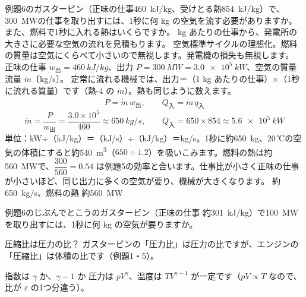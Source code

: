 \label{ph:熱-7:ex14}
\begin{phreidai}[発電所のガスタービンが吸いこむ空気の量]
例題6のガスタービン（正味の仕事\qty{460}{kJ/kg}、受けとる熱\qty{854}{kJ/kg}）で、\qty{300}{MW}の仕事を取り出すには、1秒に何 kg の空気を流す必要がありますか。また、燃料で1秒に入れる熱はいくらですか。
 kg あたりの仕事から、発電所の大きさに必要な空気の流れを見積もります。
\phmushi
空気標準サイクルの理想化。燃料の質量は空気にくらべて小さいので無視します。発電機の損失も無視します。
\phzu
正味の仕事 $w_{\text{出}}=\qty{460}{kJ/kg}$、出力 $P=\qty{300}{MW}=\qty{3.0e5}{kW}$、空気の質量流量 $\dot m$〔kg/s〕。
\phriyu
定常に流れる機械では、出力＝（1 kg あたりの仕事）×（1秒に流れる質量）です（熱-4 の $\dot m$）。熱も同じように数えます。
\phtateru
\[P=\dot m\,w_{\text{出}},\qquad\dot Q_{\text{入}}=\dot m\,q_{\text{入}}\]
\phtoku
\[\dot m=\frac{P}{w_{\text{出}}}=\frac{3.0\times10^5}{460}\approx\qty{650}{kg/s},\qquad\dot Q_{\text{入}}=650\times854\approx\qty{5.6e5}{kW}\]
\phtashikame
単位：kW÷（kJ/kg）＝（kJ/s）÷（kJ/kg）＝kg/s。1秒に約\qty{650}{kg}、20\,℃の空気の体積にすると約\qty{540}{m^3}（$650\div1.2$）を吸いこみます。燃料の熱は約\qty{560}{MW}で、$\dfrac{300}{560}=0.54$ は例題5の効率と合います。仕事比が小さく正味の仕事が小さいほど、同じ出力に多くの空気が要り、機械が大きくなります。
\kotae 約\qty{650}{kg/s}、燃料の熱 約\qty{560}{MW}
\end{phreidai}
\begin{jibun}
例題6のじぶんでとこうのガスタービン（正味の仕事 約\qty{301}{kJ/kg}）で\qty{100}{MW}を取り出すには、1秒に何 kg の空気が要りますか。
\end{jibun}

\begin{tsumazuki}{圧縮比は圧力の比？}
ガスタービンの「圧力比」は圧力の比ですが、エンジンの「圧縮比」は体積の比です（例題1・5）。
\end{tsumazuki}

\begin{tsumazuki}{指数は $\gamma$ か、$\gamma-1$ か}
圧力は $pV^{\gamma}$、温度は $TV^{\gamma-1}$ が一定です（$pV\propto T$ なので、比が $\varepsilon$ の1つ分違う）。
\end{tsumazuki}

